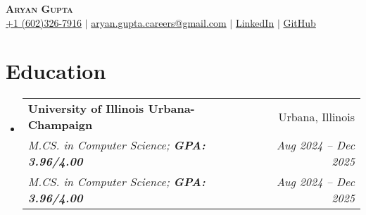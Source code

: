 \documentclass[letterpaper,11pt]{article}
\makeatletter
\newcommand{\resumeEducationHeading}[6]{
  \vspace{-2pt}\item
    \begin{tabular*}{0.97\textwidth}[t]{l@{\extracolsep{\fill}}r}
      \textbf{#1} & #2 \\
      \textit{\small#3} & \textit{\small #4} \\
      \textit{\small#5} & \textit{\small #6} \\
    \end{tabular*}\vspace{-5pt}
}
\newcommand{\resumeSubHeadingListStart}{\begin{itemize}[leftmargin=0.15in, label={}]}
\newcommand{\resumeSubHeadingListEnd}{\end{itemize}}
\makeatother
\begin{document}

\begin{center}
    \textbf{\Huge \scshape Aryan Gupta} \\ \vspace{3pt}
    \small
    \faMobile \hspace{.5pt} \href{tel:6023267916}{+1 (602)326-7916}
    $|$
    \faAt \hspace{.5pt} \href{mailto:aryan.gupta.careers@gmail.com}{aryan.gupta.careers@gmail.com}
    $|$
    \faLinkedinSquare \hspace{.5pt} \href{https://www.linkedin.com/in/agupt295}{LinkedIn}
    $|$
    \faGithub \hspace{.5pt} \href{https://github.com/agupt295}{GitHub}
\end{center}






\section{Education}
\resumeSubHeadingListStart
  \resumeEducationHeading
    {University of Illinois Urbana-Champaign}{Urbana, Illinois}
    {M.CS. in Computer Science; \textbf{GPA: 3.96/4.00}}{Aug 2024 -- Dec 2025}
    {M.CS. in Computer Science; \textbf{GPA: 3.96/4.00}}{Aug 2024 -- Dec 2025}
\resumeSubHeadingListEnd

\vspace{-0.4cm} %
\end{document}
